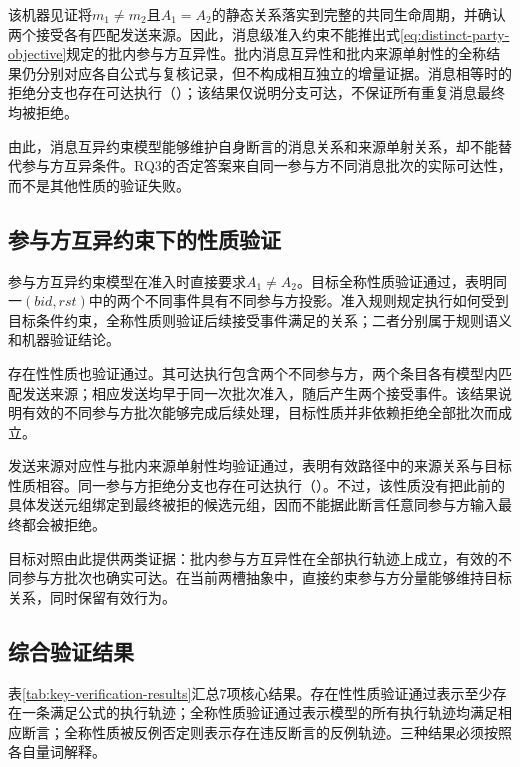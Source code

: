 该机器见证将$m_1\neq m_2$且$A_1=A_2$的静态关系落实到完整的共同生命周期，并确认两个接受各有匹配发送来源。因此，消息级准入约束不能推出式\eqref{eq:distinct-party-objective}规定的批内参与方互异性。批内消息互异性和批内来源单射性的全称结果仍分别对应各自公式与复核记录，但不构成相互独立的增量证据。消息相等时的拒绝分支也存在可达执行（）；该结果仅说明分支可达，不保证所有重复消息最终均被拒绝。

由此，消息互异约束模型能够维护自身断言的消息关系和来源单射关系，却不能替代参与方互异条件。RQ3的否定答案来自同一参与方不同消息批次的实际可达性，而不是其他性质的验证失败。

\subsection{参与方互异约束下的性质验证}
\label{subsec:party-results}

参与方互异约束模型在准入时直接要求$A_1\neq A_2$。目标全称性质验证通过，表明同一$(\mathit{bid},\mathit{rst})$中的两个不同\receiveraccept 事件具有不同参与方投影。准入规则规定执行如何受到目标条件约束，全称性质则验证后续接受事件满足的关系；二者分别属于规则语义和机器验证结论。

存在性性质也验证通过。其可达执行包含两个不同参与方，两个条目各有模型内匹配发送来源；相应发送均早于同一次批次准入，随后产生两个接受事件。该结果说明有效的不同参与方批次能够完成后续处理，目标性质并非依赖拒绝全部批次而成立。

发送来源对应性与批内来源单射性均验证通过，表明有效路径中的来源关系与目标性质相容。同一参与方拒绝分支也存在可达执行（）。不过，该性质没有把此前的具体发送元组绑定到最终被拒的候选元组，因而不能据此断言任意同参与方输入最终都会被拒绝。

目标对照由此提供两类证据：批内参与方互异性在全部执行轨迹上成立，有效的不同参与方批次也确实可达。在当前两槽抽象中，直接约束参与方分量能够维持目标关系，同时保留有效行为。

\subsection{综合验证结果}
\label{subsec:combined-results}

表\ref{tab:key-verification-results}汇总7项核心结果。存在性性质验证通过表示至少存在一条满足公式的执行轨迹；全称性质验证通过表示模型的所有执行轨迹均满足相应断言；全称性质被反例否定则表示存在违反断言的反例轨迹。三种结果必须按照各自量词解释。

